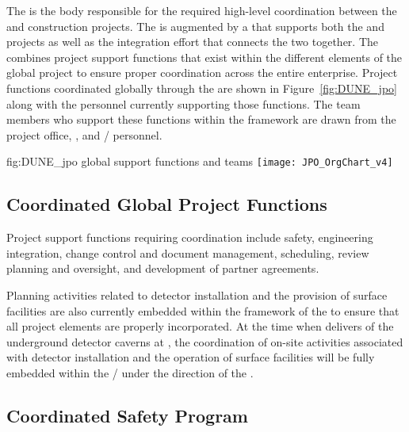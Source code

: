 The  is the body responsible for the required high-level
coordination between the  and  construction 
projects. 
The  is augmented by a  that supports both 
the  and  projects as well as the integration
effort that connects the two together. The  combines
project support functions that exist within the different elements 
of the global project to ensure proper coordination across the entire 
 enterprise.  Project functions coordinated globally 
through the  are shown in Figure~\ref{fig:DUNE_jpo} along 
with the personnel currently supporting those functions.  The team 
members who support these functions within the  framework
are drawn from the  project office,  , 
and /  personnel.  
\begin{dunefigure}{fig:DUNE_jpo}
  { global support functions and teams}
  \texttt{[image: JPO\_OrgChart\_v4]}
\end{dunefigure}


\subsection{Coordinated Global Project Functions}

Project support functions requiring  coordination include
safety, engineering integration, change control and document 
management, scheduling, review planning and oversight, and development 
of partner agreements.  

Planning activities related to detector installation and the provision 
of surface facilities are also currently embedded within the framework 
of the  to ensure that all project elements are properly 
incorporated.  At the time when   delivers 
 of the underground detector caverns at , the 
coordination of on-site activities associated with detector installation 
and the operation of surface facilities will be fully embedded within 
the /  under the direction of the .  


\subsection{Coordinated Safety Program}    %
\label{sec:dune_safety}

